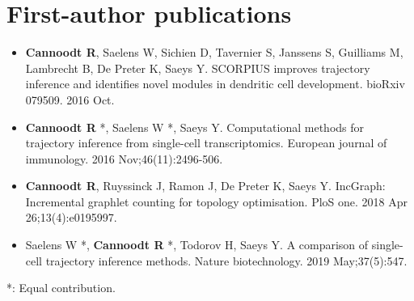 \section{First-author publications}

\begin{itemize}
	\item \textbf{Cannoodt R}, Saelens W, Sichien D, Tavernier S, Janssens S, Guilliams M, Lambrecht B, De Preter K, Saeys Y. SCORPIUS improves trajectory inference and identifies novel modules in dendritic cell development. bioRxiv 079509. 2016 Oct.
	\item \textbf{Cannoodt R} *, Saelens W *, Saeys Y. Computational methods for trajectory inference from single-cell transcriptomics. European journal of immunology. 2016 Nov;46(11):2496-506.
	\item \textbf{Cannoodt R}, Ruyssinck J, Ramon J, De Preter K, Saeys Y. IncGraph: Incremental graphlet counting for topology optimisation. PloS one. 2018 Apr 26;13(4):e0195997.
	\item Saelens W *, \textbf{Cannoodt R} *, Todorov H, Saeys Y. A comparison of single-cell trajectory inference methods. Nature biotechnology. 2019 May;37(5):547.
\end{itemize}

*: Equal contribution.

